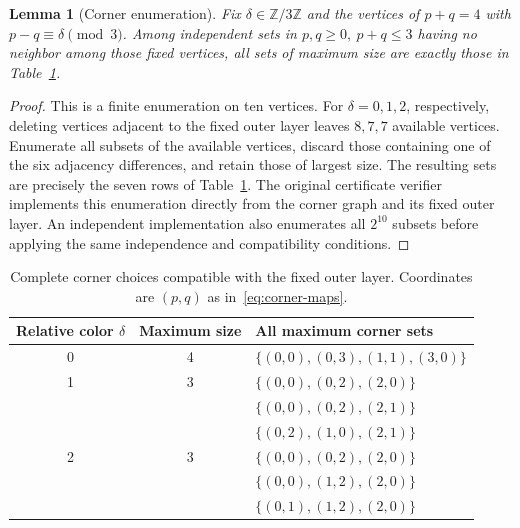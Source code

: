 \documentclass[11pt]{article}
\newtheorem{lemma}[theorem]{Lemma}
\newcommand{\Z}{\mathbb Z}
\begin{document}
\begin{lemma}[Corner enumeration]\label{lem:corners}
Fix \(\delta\in\Z/3\Z\) and the vertices of \(p+q=4\) with
\(p-q\equiv\delta\pmod3\).
Among independent sets in \(p,q\geq0,\ p+q\leq3\) having no
neighbor among those fixed vertices, all sets of maximum size are
exactly those in Table~\ref{tab:corners}.
\end{lemma}

\begin{proof}
This is a finite enumeration on ten vertices.
For \(\delta=0,1,2\), respectively, deleting vertices adjacent to the
fixed outer layer leaves \(8,7,7\) available vertices.
Enumerate all subsets of the available vertices, discard those
containing one of the six adjacency differences, and retain those
of largest size. The resulting sets are precisely the seven rows
of Table~\ref{tab:corners}.
The original certificate verifier implements this enumeration
directly from the corner graph and its fixed outer layer.
An independent implementation also enumerates all \(2^{10}\)
subsets before applying the same independence and compatibility
conditions.
\end{proof}

\begin{table}[htbp]
\centering
\small
\begin{tabular}{ccl}
\toprule
Relative color \(\delta\)&Maximum size&All maximum corner sets\\
\midrule
0&4&\(\{(0,0),(0,3),(1,1),(3,0)\}\)\\
\midrule
1&3&\(\{(0,0),(0,2),(2,0)\}\)\\
 & &\(\{(0,0),(0,2),(2,1)\}\)\\
 & &\(\{(0,2),(1,0),(2,1)\}\)\\
\midrule
2&3&\(\{(0,0),(0,2),(2,0)\}\)\\
 & &\(\{(0,0),(1,2),(2,0)\}\)\\
 & &\(\{(0,1),(1,2),(2,0)\}\)\\
\bottomrule
\end{tabular}
\caption{Complete corner choices compatible with the fixed outer layer.
Coordinates are \((p,q)\) as in~\eqref{eq:corner-maps}.}
\label{tab:corners}
\end{table}
\end{document}

